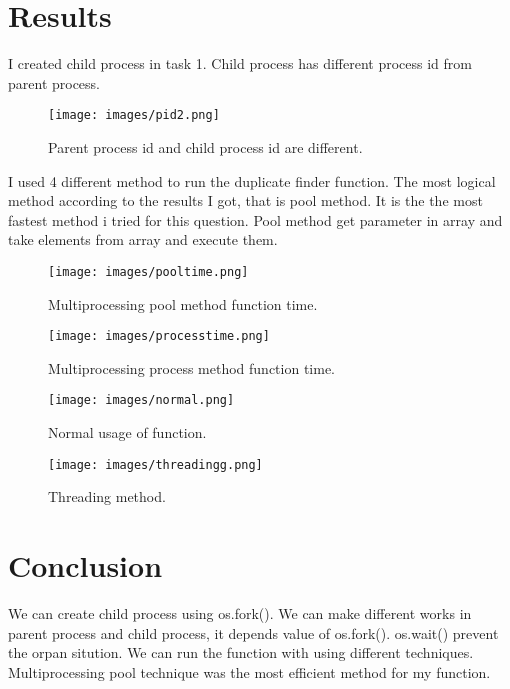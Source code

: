 \documentclass[onecolumn]{article}
\begin{document}
\section{Results}

I created child process in task 1. Child process has different process id from parent process.  

\begin{figure}[h!]
  \begin{center}
  \texttt{[image: images/pid2.png]}
  \end{center}
  \caption{Parent process id and child process id are different.}
\end{figure}

I used 4 different method to run the duplicate finder function. The most logical method according to the results I got, that is pool method. It is the the most fastest method i tried for this question. Pool method get parameter in array and take elements from array and execute them.




\begin{figure}[h!]
  \begin{center}
  \texttt{[image: images/pooltime.png]}
  \end{center}
  \caption{Multiprocessing pool method function time.}
\end{figure}

\begin{figure}[h!]
  \begin{center}
  \texttt{[image: images/processtime.png]}
  \end{center}
  \caption{Multiprocessing process method function time.}
\end{figure}

\begin{figure}[h!]
  \begin{center}
  \texttt{[image: images/normal.png]}
  \end{center}
  \caption{Normal usage of function.}
\end{figure}

\begin{figure}[h!]
  \begin{center}
  \texttt{[image: images/threadingg.png]}
  \end{center}
  \caption{Threading method.}
\end{figure}





\section{Conclusion}
    
    We can create child process using os.fork(). We can make different works in parent process and child process, it depends value of os.fork(). os.wait() prevent the orpan sitution. We can run the function with using different techniques. Multiprocessing pool technique was the most efficient method for my function.




\nocite{*}


\end{document}
